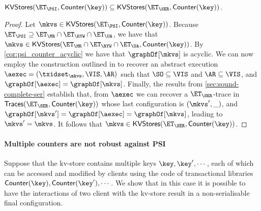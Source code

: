 \begin{corollary}
$\mathsf{KVStores}(\ET_{\PSI}, \mathsf{Counter}(\key)) \subseteq \mathsf{KVStores}(\ET_{\SER}, \mathsf{Counter}(\key))$. 
\end{corollary}

\begin{proof}
Let $\mkvs \in \mathsf{KVStores}(\ET_{\PSI}, \mathsf{Counter}(\key))$. Because $\ET_{\PSI} \supseteq \ET_{\MR} \cap \ET_{\RYW} \cap \ET_{\UA}$, 
we have that $\mkvs \in \mathsf{KVStores}(\ET_{\MR} \cap \ET_{\RYW} \cap \ET_{\UA}, \mathsf{Counter}(\key))$. 
By \cref{cor:psi_counter_acyclic} we have that $\graphOf[\mkvs]$ is acyclic. We can now employ the construction 
outlined in \cite{laws} to recover an abstract execution $\aexec = (\txidset_{\mkvs}, \VIS, \AR)$ such that $\SO \subseteq \VIS$ and $\AR \subseteq \VIS$, 
and $\graphOf[\aexec] = \graphOf[\mkvs]$.
Finally, the results from \cref{sec:sound-complete-ser} establish that, from $\aexec$ we can recover a $\ET_{\SER}$-trace in 
$\mathsf{Traces}(\ET_{\SER}, \mathsf{Counter}(\key))$ 
whose last configuration is $(\mkvs', \_)$, and 
$\graphOf[\mkvs'] = \graphOf[\aexec] = \graphOf[\mkvs]$, leading to $\mkvs' = \mkvs$. It follows that $\mkvs \in 
\mathsf{KVStores}(\ET_{\SER}, \mathsf{Counter}(\key))$.
\end{proof}

\paragraph{Multiple counters are not robust against PSI}
Suppose that the kv-store contains multiple keys $\key, \key', \cdots$, each of which 
can be accessed and modified by clients using the code of transactional libraries 
$\mathsf{Counter}(\key), \mathsf{Counter}(\key'), \cdots$. We show that in this
 case it is possible to have the interactions of two client with the kv-store result 
 in  a non-serialisable final configuration. 
 
